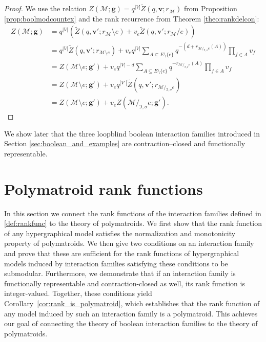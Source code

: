 \documentclass[11pt,reqno]{amsart}
\newcommand{\vecv}{\boldsymbol{v}}
\newcommand{\vecg}{\boldsymbol{g}}
\newcommand{\Mo}{\mathcal{M}}
\newcommand{\IFam}{\mathfrak{I}}
\theoremstyle{plain}
\theoremstyle{definition}
\numberwithin{equation}{section}
\begin{document}
\begin{proof}
    We use the relation $Z(\Mo; \vecg) = q^{|V|} \widetilde{Z}(q, \vecv; r_{\Mo})$ from Proposition \ref{prop:boolmodcountex} and the rank recurrence from Theorem \ref{theo:rankdelcon}:
    \begin{align*}
        Z(\Mo; \vecg) &= q^{|V|} \left( \widetilde{Z}(q, \vecv'; r_{\Mo}\setminus e) + v_e \widetilde{Z}(q, \vecv'; r_{\Mo}/ e) \right) \\
        &= q^{|V|} \widetilde{Z}(q, \vecv'; r_{\Mo \setminus e}) + v_e q^{|V|} \sum_{A \subseteq E \setminus \{e\}} q^{-(d + r_{\Mo/_{\IFam, \sigma}e}(A))} \prod_{f \in A} v_f \\
        &= Z(\Mo \setminus e; \vecg') + v_e q^{|V|-d} \sum_{A \subseteq E \setminus \{e\}} q^{-r_{\Mo/_{\IFam, \sigma}e}(A)} \prod_{f \in A} v_f \\
        &= Z(\Mo \setminus e; \vecg') + v_e q^{|V'|} \widetilde{Z}(q, \vecv'; r_{\Mo/_{\IFam, \sigma}e}) \\
        &= Z(\Mo \setminus e; \vecg') + v_e Z(\Mo/_{\IFam,\sigma}e;\vecg').
    \end{align*}
\end{proof}

We show later that the three loopblind boolean interaction families introduced in Section \ref{sec:boolean_and_examples} are contraction--closed and functionally representable.


\section{Polymatroid rank functions}
\label{sec:polrank}
In this section we connect the rank functions of the interaction families defined in \ref{def:rankfunc} to the theory of polymatroids. We first show that the rank function of any hypergraphical model satisfies the normalization and monotonicity property of polymatroids. We then give two conditions on an interaction family and prove that these are sufficient for the rank functions of hypergraphical models induced by interaction families satisfying these conditions to be submodular. Furthermore, we demonstrate that if an interaction family is functionally representable and contraction-closed as well, its rank function is integer-valued. Together, these conditions yield Corollary~\ref{cor:rank_is_polymatroid}, which establishes that the rank function of any model induced by such an interaction family is a polymatroid. This achieves our goal of connecting the theory of boolean interaction families to the theory of polymatroids.
\end{document}
